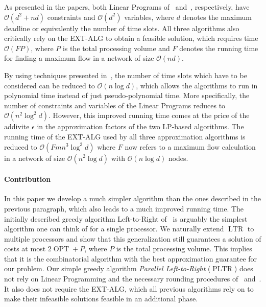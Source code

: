 \documentclass[a4paper]{article}
\DeclareMathOperator{\OPT}{OPT}
\DeclareMathOperator{\PLTR}{PLTR}
\DeclareMathOperator{\LTR}{LTR}
\begin{document}
As presented in the papers, both Linear Programs of~\cite{antoniadis} and~\cite{skeletons}, respectively, have $\mathcal{O}(d^2 + nd)$ constraints and $\mathcal{O}(d^2)$ variables, where $d$ denotes the maximum deadline or equivalently the number of time slots.
All three algorithms also critically rely on the EXT-ALG to obtain a feasible solution, which requires time $\mathcal{O}(FP)$, where $P$ is the total processing volume and $F$ denotes the running time for finding a maximum flow in a network of size $\mathcal{O}(nd)$.

By using techniques presented in~\cite{antoniadis}, the number of time slots which have to be considered can be reduced to $\mathcal{O}(n \log d)$, which allows the algorithms to run in polynomial time instead of just pseudo-polynomial time.
More specifically, the number of constraints and variables of the Linear Programs reduces to $\mathcal{O}(n^2 \log^2 d)$.
However, this improved running time comes at the price of the addivite $\epsilon$ in the approximation factors of the two LP-based algorithms.
The running time of the EXT-ALG used by all three approximation algorithms is reduced to $\mathcal{O}(F m n^3 \log^3 d)$ where $F$ now refers to a maximum flow calculation in a network of size $\mathcal{O}(n^2 \log d)$ with $\mathcal{O}(n \log d)$ nodes.

\paragraph{Contribution}
In this paper we develop a much simpler algorithm than the ones described in the previous paragraph, which also leads to a much improved running time.
The initially described greedy algorithm Left-to-Right of~\cite{irani_left_to_right_soda_2003} is arguably the simplest algorithm one can think of for a single processor.
We naturally extend $\LTR$ to multiple processors and show that this generalization still guarantees a solution of costs at most $2 \OPT + P$, where $P$ is the total processing volume.
This implies that it is the combinatorial algorithm with the best approximation guarantee for our problem.
Our simple greedy algorithm \textit{Parallel Left-to-Right} ($\PLTR$) does not rely on Linear Programming and the necessary rounding procedures of~\cite{antoniadis} and~\cite{skeletons}.
It also does not require the EXT-ALG, which all previous algorithms rely on to make their infeasible solutions feasible in an additional phase.
\end{document}
